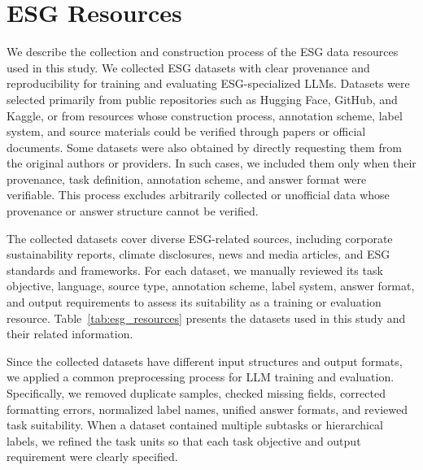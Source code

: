 \documentclass[11pt]{article}
\begin{document}
\clearpage
\appendix
\setcounter{table}{0}
\setcounter{figure}{0}
\setcounter{equation}{0}

\renewcommand{\thetable}{A.\arabic{table}}
\renewcommand{\thefigure}{A.\arabic{figure}}

\appendix

\section{ESG Resources}
\label{app:esg_resources}
We describe the collection and construction process of the ESG data resources used in this study. We collected ESG datasets with clear provenance and reproducibility for training and evaluating ESG-specialized LLMs. Datasets were selected primarily from public repositories such as Hugging Face, GitHub, and Kaggle, or from resources whose construction process, annotation scheme, label system, and source materials could be verified through papers or official documents. Some datasets were also obtained by directly requesting them from the original authors or providers. In such cases, we included them only when their provenance, task definition, annotation scheme, and answer format were verifiable. This process excludes arbitrarily collected or unofficial data whose provenance or answer structure cannot be verified.

The collected datasets cover diverse ESG-related sources, including corporate sustainability reports, climate disclosures, news and media articles, and ESG standards and frameworks. For each dataset, we manually reviewed its task objective, language, source type, annotation scheme, label system, answer format, and output requirements to assess its suitability as a training or evaluation resource. Table~\ref{tab:esg_resources} presents the datasets used in this study and their related information.

Since the collected datasets have different input structures and output formats, we applied a common preprocessing process for LLM training and evaluation. Specifically, we removed duplicate samples, checked missing fields, corrected formatting errors, normalized label names, unified answer formats, and reviewed task suitability. When a dataset contained multiple subtasks or hierarchical labels, we refined the task units so that each task objective and output requirement were clearly specified.
\end{document}
